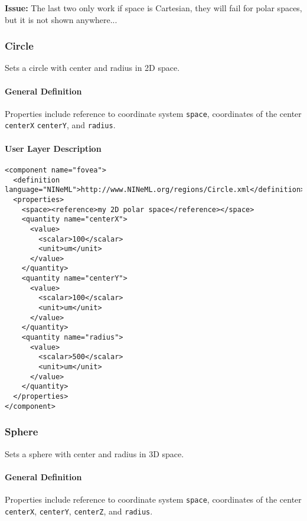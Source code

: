 \documentclass{article}
\newcommand{\issue}[1]{%
\begin{center}
\colorbox{issuecolor}{\parbox{0.8\linewidth}{\textbf{Issue:} #1}}
\end{center}%
}
\begin{document}
\issue{The last two only work if space is Cartesian, they will fail for polar
spaces, but it is not shown anywhere...}

\subsubsection{Circle}

Sets a circle with center and radius in 2D space.

\paragraph{General Definition}
Properties include reference to coordinate system {\tt space}, coordinates of
the center {\tt centerX} {\tt centerY}, and {\tt radius}.

\paragraph{User Layer Description}
\begin{verbatim}
<component name="fovea">
  <definition language="NINeML">http://www.NINeML.org/regions/Circle.xml</definition>
  <properties>
    <space><reference>my 2D polar space</reference></space>
    <quantity name="centerX">
      <value>
        <scalar>100</scalar>
        <unit>um</unit>
      </value>
    </quantity>
    <quantity name="centerY">
      <value>
        <scalar>100</scalar>
        <unit>um</unit>
      </value>
    </quantity>
    <quantity name="radius">
      <value>
        <scalar>500</scalar>
        <unit>um</unit>
      </value>
    </quantity>
  </properties>
</component>
\end{verbatim}

\subsubsection{Sphere}

Sets a sphere with center and radius in 3D space.

\paragraph{General Definition}
Properties include reference to coordinate system {\tt space}, coordinates of
the center {\tt centerX}, {\tt centerY}, {\tt centerZ}, and {\tt radius}.
\end{document}

